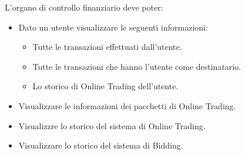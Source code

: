 L'organo di controllo finanziario deve poter:
\begin{itemize}
    \item Dato un utente visualizzare le seguenti informazioni:
        \begin{itemize}
            \item Tutte le transazioni effettuati dall'utente.
            \item Tutte le transazioni che hanno l'utente come destinatario.
            \item Lo storico di Online Trading dell'utente.
        \end{itemize}
    \item Visualizzare le informazioni dei pacchetti di Online Trading.
    \item Visualizzre lo storico del sistema di Online Trading.
    \item Visualizzare lo storico del sistema di Bidding.
\end{itemize}




